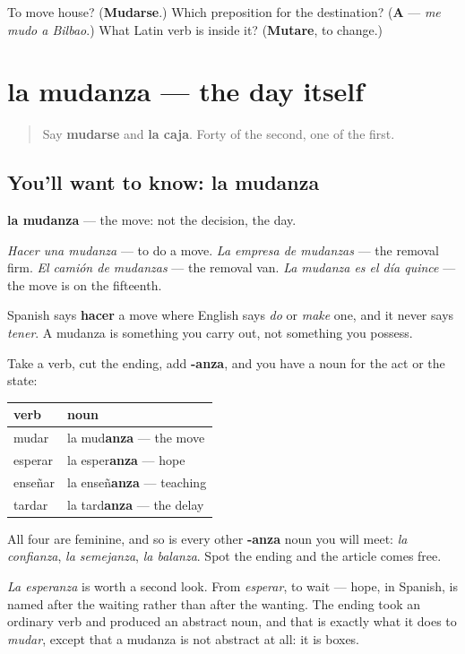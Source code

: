 \begin{tcolorbox}[breakable,colback=teal!4,colframe=teal!35!black,title={Before you move on}]
To move house? (\textbf{Mudarse}.) Which preposition for the destination? (\textbf{A} — \emph{me mudo a Bilbao}.) What Latin verb is inside it? (\textbf{Mutare}, to change.)
\end{tcolorbox}
\section[la mudanza]{la mudanza — the day itself}

\label{lesson:ES-C448-mudanza}



\begin{quote}
Say \textbf{mudarse} and \textbf{la caja}. Forty of the second, one of the first.
\end{quote}

\subsection*{You'll want to know: la mudanza}
\textbf{la mudanza} — the move: not the decision, the day.

\emph{Hacer una mudanza} — to do a move. \emph{La empresa de mudanzas} — the removal firm. \emph{El camión de mudanzas} — the removal van. \emph{La mudanza es el día quince} — the move is on the fifteenth.

Spanish says \textbf{hacer} a move where English says \emph{do} or \emph{make} one, and it never says \emph{tener}. A mudanza is something you carry out, not something you possess.

\begin{grammarlens}[title={Grammar Lens: -anza names the doing}]
Take a verb, cut the ending, add \textbf{-anza}, and you have a noun for the act or the state:

\noindent
\begin{tabularx}{\linewidth}{@{}>{\raggedright\arraybackslash}X>{\raggedright\arraybackslash}X@{}}
\toprule
\textbf{verb} & \textbf{noun} \\
\midrule
mudar & la mud\textbf{anza} — the move \\
esperar & la esper\textbf{anza} — hope \\
enseñar & la enseñ\textbf{anza} — teaching \\
tardar & la tard\textbf{anza} — the delay \\
\bottomrule
\end{tabularx}

All four are feminine, and so is every other \textbf{-anza} noun you will meet: \emph{la confianza}, \emph{la semejanza}, \emph{la balanza}. Spot the ending and the article comes free.

\emph{La esperanza} is worth a second look. From \emph{esperar}, to wait — hope, in Spanish, is named after the waiting rather than after the wanting. The ending took an ordinary verb and produced an abstract noun, and that is exactly what it does to \emph{mudar}, except that a mudanza is not abstract at all: it is boxes.
\end{grammarlens}

